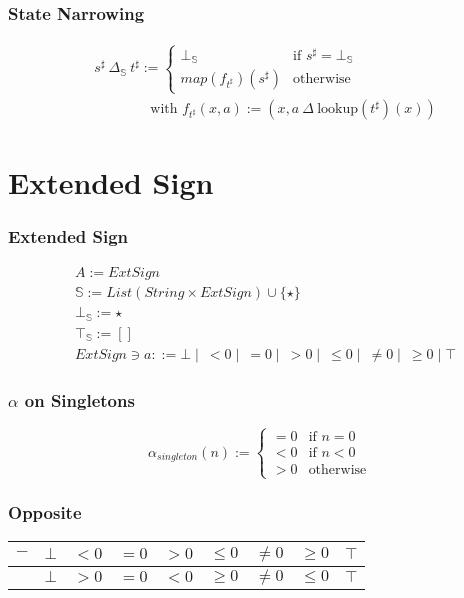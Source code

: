 \documentclass[aspectratio=169]{beamer}
\begin{document}
\begin{frame}
    \frametitle{State Narrowing}
    \begin{align*} 
        &s^{\sharp}\ \Delta_\mathbb{S}\ t^{\sharp} := \begin{cases}
                                                    \bot_\mathbb{S} & \text{if } s^{\sharp} = \bot_\mathbb{S}\\
                                                    map (f_{t^{\sharp}}) (s^{\sharp}) & \text{otherwise}
                                                    \end{cases} \\
                & \qquad \qquad \text{with } f_{t^{\sharp}}(x, a) := (x, a\ \Delta\ \text{lookup} (t^{\sharp}) (x))
                                                \end{align*}
\end{frame}

\section{Extended Sign}

\begin{frame}
    \frametitle{Extended Sign}
    \begin{align*}
        &A := ExtSign\\
        &\mathbb{S} := List(String \times ExtSign) \cup \{ \star \} \\
        &\bot_\mathbb{S} := \star \\
        &\top_\mathbb{S} := [] \\
        &ExtSign \ni a ::= \bot \mid\ < 0 \mid\ = 0 \mid\ > 0 \mid\ \le 0 \mid\ \ne 0 \mid\ \ge 0 \mid \top
    \end{align*}
\end{frame}

\begin{frame}
    \frametitle{\( \alpha \) on Singletons}
    \[
        \alpha_{singleton}(n) := \begin{cases}
            =0 & \text{if } n=0\\
            <0 & \text{if } n<0\\
            >0 & \text{otherwise}
        \end{cases}    
    \]
\end{frame}


\begin{frame}
    \frametitle{Opposite}

    \begin{table}[]
        \begin{tabular}{|l|l|l|l|l|l|l|l|l|}
        \hline
        \textbf{$-$} & \textbf{$\bot$} & \textbf{$< 0$} & \textbf{$= 0$} & \textbf{$> 0$} & \textbf{$\le 0$} & \textbf{$\ne 0$} & \textbf{$\ge 0$} & \textbf{$\top$} \\ \hline
                     & $\bot$          & $> 0$          & $= 0$          & $< 0$          & $\ge 0$          & $\ne 0$          & $\le 0$          & $\top$          \\ \hline
        \end{tabular}
        \end{table}
\end{frame}
\end{document}

